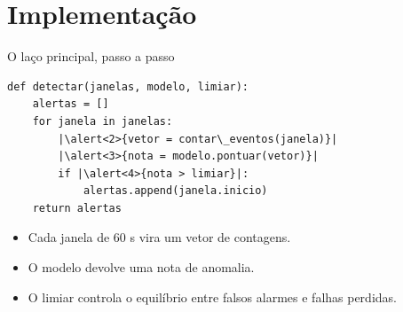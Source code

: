 \documentclass[11pt,aspectratio=169]{beamer}
\newif\ifinstrucoes
\newcommand{\instrucao}[1]{\ifinstrucoes\par\vfill{\color{gray}\scriptsize\itshape #1\par}\fi}
\begin{document}
\section{Implementação}
\begin{frame}[fragile]{O laço principal, passo a passo}
\begin{lstlisting}
def detectar(janelas, modelo, limiar):
    alertas = []
    for janela in janelas:
        |\alert<2>{vetor = contar\_eventos(janela)}|
        |\alert<3>{nota = modelo.pontuar(vetor)}|
        if |\alert<4>{nota > limiar}|:
            alertas.append(janela.inicio)
    return alertas
\end{lstlisting}
  \begin{itemize}
    \item<2-> Cada janela de 60 s vira um vetor de contagens.
    \item<3-> O modelo devolve uma nota de anomalia.
    \item<4-> O limiar controla o equilíbrio entre falsos alarmes e falhas perdidas.
  \end{itemize}
  \instrucao{Mostre só o trecho que explica a ideia, com até 10 linhas. Cada passo do slide destaca uma linha e acrescenta a explicação.}
\end{frame}

\end{document}
